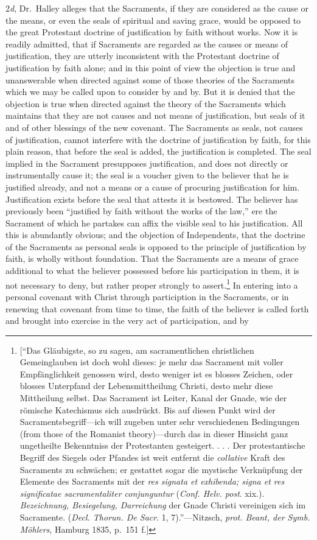 \documentclass[english,]{book}
\begin{document}
2\emph{d}, Dr.~Halley alleges that the Sacraments, if they are considered as the cause or the means, or even the seals of spiritual and saving grace, would be opposed to the great Protestant doctrine of justification by faith without works. Now it is readily admitted, that if Sacraments are regarded as the causes or means of justification, they are utterly inconsistent with the Protestant doctrine of justification by faith alone; and in this point of view the objection is true and unanswerable when directed against some of those theories of the Sacraments which we may be called upon to consider by and by. But it is denied that the objection is true when directed against the theory of the Sacraments which maintains that they are not causes and not means of justification, but seals of it and of other blessings of the new covenant. The Sacraments as seals, not causes of justification, cannot interfere with the doctrine of justification by faith, for this plain reason, that before the seal is added, the justification is completed. The seal implied in the Sacrament presupposes justification, and does not directly or instrumentally cause it; the seal is a voucher given to the believer that he is justified already, and not a means or a cause of procuring justification for him. Justification exists before the seal that attests it is bestowed. The believer has previously been ``justified by faith without the works of the law,'' ere the Sacrament of which he partakes can affix the visible seal to his justification. All this is abundantly obvious; and the objection of Independents, that the doctrine of the Sacraments as personal seals is opposed to the principle of justification by faith, is wholly without foundation. That the Sacraments are a means of grace additional to what the believer possessed before his participation in them, it is not necessary to deny, but rather proper strongly to assert.\footnote{{[}``Das Gläubigste, so zu sagen, am sacramentlichen christlichen Gemeinglauben ist doch wohl dieses: je mehr das Sacrament mit voller Empfänglichkeit genossen wird, desto weniger ist es blosses Zeichen, oder blosses Unterpfand der Lebensmittheilung Christi, desto mehr diese Mittheilung selbst. Das Sacrament ist Leiter, Kanal der Gnade, wie der römische Katechismus sich ausdrückt. Bis auf diesen Punkt wird der Sacramentsbegriff---ich will zugeben unter sehr verschiedenen Bedingungen (from those of the Romanist theory)---durch das in dieser Hinsicht ganz ungetheilte Bekenntniss der Protestanten gesteigert. . . . Der protestantische Begriff des Siegels oder Pfandes ist weit entfernt die \emph{collative} Kraft des Sacraments zu schwächen; er gestattet sogar die mystische Verknüpfung der Elemente des Sacraments mit der \emph{res signata et exhibenda; signa et res significatae sacramentaliter conjunguntur} (\emph{Conf. Helv. post}. xix.). \emph{Bezeichnung, Besiegelung, Darreichung} der Gnade Christi vereinigen sich im Sacramente. (\emph{Decl. Thorun. De Sacr}. 1, 7).''---Nitzsch, \emph{prot. Beant, der Symb. Möhlers}, Hamburg 1835, p.~151 f.{]}} In entering into a personal covenant with Christ through particiption in the Sacraments, or in renewing that covenant from time to time, the faith of the believer is called forth and brought into exercise in the very act of participation, and by 
\end{document}
